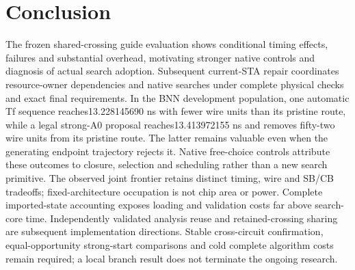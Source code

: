 \documentclass[conference,10pt]{IEEEtran}
\begin{document}
\section{Conclusion}
The frozen shared-crossing guide evaluation shows conditional timing effects, failures and substantial overhead, motivating stronger native controls and diagnosis of actual search adoption. Subsequent current-STA repair coordinates resource-owner dependencies and native searches under complete physical checks and exact final requirements. In the BNN development population, one automatic Tf sequence reaches13.228145690 ns with fewer wire units than its pristine route, while a legal strong-A0 proposal reaches13.413972155 ns and removes fifty-two wire units from its pristine route. The latter remains valuable even when the generating endpoint trajectory rejects it. Native free-choice controls attribute these outcomes to closure, selection and scheduling rather than a new search primitive. The observed joint frontier retains distinct timing, wire and SB/CB tradeoffs; fixed-architecture occupation is not chip area or power. Complete imported-state accounting exposes loading and validation costs far above search-core time. Independently validated analysis reuse and retained-crossing sharing are subsequent implementation directions. Stable cross-circuit confirmation, equal-opportunity strong-start comparisons and cold complete algorithm costs remain required; a local branch result does not terminate the ongoing research.

\clearpage


\end{document}
